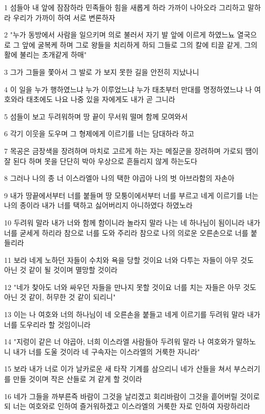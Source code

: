 \par 1 섬들아 내 앞에 잠잠하라 민족들아 힘을 새롭게 하라 가까이 나아오라 그리하고 말하라 우리가 가까이 하여 서로 변론하자
\par 2 "누가 동방에서 사람을 일으키며 의로 불러서 자기 발 앞에 이르게 하였느뇨 열국으로 그 앞에 굴복케 하며 그로 왕들을 치리하게 하되 그들로 그의 칼에 티끌 같게, 그의 활에 불리는 초개같게 하매"
\par 3 그가 그들을 쫓아서 그 발로 가 보지 못한 길을 안전히 지났나니
\par 4 이 일을 누가 행하였느냐 누가 이루었느냐 누가 태초부터 만대를 명정하였느냐 나 여호와라 태초에도 나요 나중 있을 자에게도 내가 곧 그니라
\par 5 섬들이 보고 두려워하며 땅 끝이 무서워 떨며 함께 모여와서
\par 6 각기 이웃을 도우며 그 형제에게 이르기를 너는 담대하라 하고
\par 7 목공은 금장색을 장려하며 마치로 고르게 하는 자는 메질군을 장려하며 가로되 땜이 잘 된다 하며 못을 단단히 박아 우상으로 흔들리지 않게 하는도다
\par 8 그러나 나의 종 너 이스라엘아 나의 택한 야곱아 나의 벗 아브라함의 자손아
\par 9 내가 땅끝에서부터 너를 붙들며 땅 모퉁이에서부터 너를 부르고 네게 이르기를 너는 나의 종이라 내가 너를 택하고 싫어버리지 아니하였다 하였노라
\par 10 두려워 말라 내가 너와 함께 함이니라 놀라지 말라 나는 네 하나님이 됨이니라 내가 너를 굳세게 하리라 참으로 너를 도와 주리라 참으로 나의 의로운 오른손으로 너를 붙들리라
\par 11 보라 네게 노하던 자들이 수치와 욕을 당할 것이요 너와 다투는 자들이 아무 것도 아닌 것 같이 될 것이며 멸망할 것이라
\par 12 "네가 찾아도 너와 싸우던 자들을 만나지 못할 것이요 너를 치는 자들은 아무 것도 아닌 것 같이, 허무한 것 같이 되리니"
\par 13 이는 나 여호와 너의 하나님이 네 오른손을 붙들고 네게 이르기를 두려워 말라 내가 너를 도우리라 할 것임이니라
\par 14 "지렁이 같은 너 야곱아, 너희 이스라엘 사람들아 두려워 말라 나 여호와가 말하노니 내가 너를 도울 것이라 네 구속자는 이스라엘의 거룩한 자니라"
\par 15 보라 내가 너로 이가 날카로운 새 타작 기계를 삼으리니 네가 산들을 쳐서 부스러기를 만들 것이며 작은 산들로 겨 같게 할 것이라
\par 16 네가 그들을 까부른즉 바람이 그것을 날리겠고 회리바람이 그것을 흩어버릴 것이로되 너는 여호와로 인하여 즐거워하겠고 이스라엘의 거룩한 자로 인하여 자랑하리라
